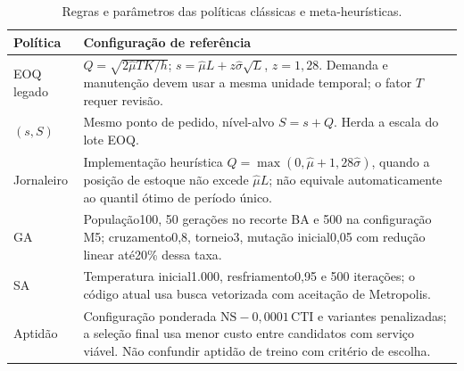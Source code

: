 \begin{table}[htbp]\centering\small
\caption{Regras e parâmetros das políticas clássicas e meta-heurísticas.}\label{tab:classic_meta_params}
\begin{tabular}{@{}p{3cm}p{11.4cm}@{}}\toprule
\textbf{Política} & \textbf{Configuração de referência}\\\midrule
EOQ legado & $Q=\sqrt{2\hat\mu T K/h}$; $s=\hat\mu L+z\hat\sigma\sqrt L$, $z=1,28$. Demanda e manutenção devem usar a mesma unidade temporal; o fator $T$ requer revisão.\\
$(s,S)$ & Mesmo ponto de pedido, nível-alvo $S=s+Q$. Herda a escala do lote EOQ.\\
Jornaleiro & Implementação heurística $Q=\max(0,\hat\mu+1,28\hat\sigma)$, quando a posição de estoque não excede $\hat\mu L$; não equivale automaticamente ao quantil ótimo de período único.\\
GA & População100, 50 gerações no recorte BA e 500 na configuração M5; cruzamento0,8, torneio3, mutação inicial0,05 com redução linear até20\% dessa taxa.\\
SA & Temperatura inicial1.000, resfriamento0,95 e 500 iterações; o código atual usa busca vetorizada com aceitação de Metropolis.\\
Aptidão & Configuração ponderada $\mathrm{NS}-0,0001\,\mathrm{CTI}$ e variantes penalizadas; a seleção final usa menor custo entre candidatos com serviço viável. Não confundir aptidão de treino com critério de escolha.\\
\bottomrule\end{tabular}\end{table}

